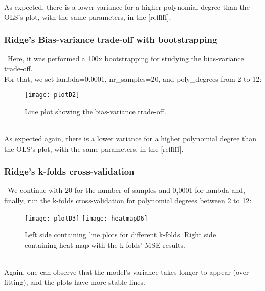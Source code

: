As expected,  there is a lower variance for a higher polynomial degree than the OLS's plot, with the same parameters, in the [refffff]. \\

\subsubsection{Ridge's Bias-variance trade-off with bootstrapping}
\label{chap:Ridge's Bias-variance trade-off with bootstrapping}

\quad \, Here, it was performed a 100x bootstrapping for studying the bias-variance trade-off. \\

For that, we set lambda=0.0001, nr\_samples=20, and poly\_degrees from 2 to 12: \\

\begin{figure}[H]
\label{fig:BiasplotD2}
\centering
\texttt{[image: plotD2]}
\caption{Line plot showing the bias-variance trade-off.}
\end{figure}\\

As expected again, there is a lower variance for a higher polynomial degree than the OLS's plot, with the same parameters, in the [refffff]. \\

\subsubsection{Ridge's k-folds cross-validation}
\label{chap:Ridge's k-folds cross-validation}

\quad \, We continue with 20 for the number of samples and 0,0001 for lambda and, finally, run the k-folds cross-validation for polynomial degrees between 2 to 12: \\

\begin{figure}[H]
\label{fig:plotD3andh6}
\centering
\texttt{[image: plotD3]}
\texttt{[image: heatmapD6]}
\caption{Left side containing line plots for different k-folds. Right side containing heat-map with the k-folds' MSE results.}
\end{figure}\\

Again, one can observe that the model's variance takes longer to appear (over-fitting), and the plots have more stable lines. \\

